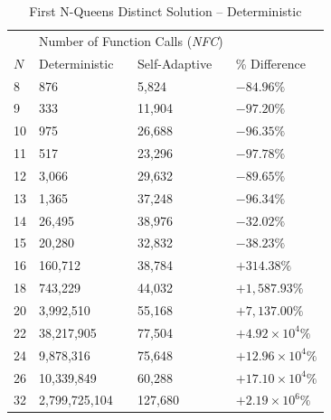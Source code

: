 \documentclass[conference]{IEEEtran}
\begin{document}
\begin{table}
\centering
\caption{First N-Queens Distinct Solution -- Deterministic}
{\renewcommand{\arraystretch}{1.2}
\begin{tabular}{|l|l|l|l|} \hline
&       \multicolumn{2}{c|}{Number of Function Calls (\emph{NFC})}& \\ \cline{2-3}
$N$&    Deterministic&  Self-Adaptive&  \% Difference \\ \hline
8&      876&            5,824&          $ -84.96\% $ \\ \hline
9&      333&            11,904&         $ -97.20\% $ \\ \hline
10&     975&            26,688&         $ -96.35\% $ \\ \hline
11&     517&            23,296&         $ -97.78\% $ \\ \hline
12&     3,066&          29,632&         $ -89.65\% $ \\ \hline
13&     1,365&          37,248&         $ -96.34\% $ \\ \hline
14&     26,495&         38,976&         $ -32.02\% $ \\ \hline
15&     20,280&         32,832&         $ -38.23\% $ \\ \hline
16&     160,712&        38,784&         $ +314.38\% $ \\ \hline
18&     743,229&        44,032&         $ +1,587.93\% $ \\ \hline
20&     3,992,510&      55,168&         $ +7,137.00\% $ \\ \hline
22&     38,217,905&     77,504&         $ +4.92\times10^{4}\% $ \\ \hline
24&     9,878,316&      75,648&         $ +12.96\times10^{4}\% $ \\ \hline
26&     10,339,849&     60,288&         $ +17.10\times10^{4}\% $ \\ \hline
32&     2,799,725,104&  127,680&        $ +2.19\times10^{6}\% $ \\ \hline
\end{tabular}}
\label{table:firstsol_deterministic}
\end{table}

\end{document}
